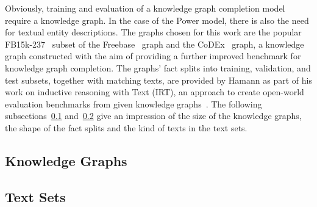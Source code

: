 Obviously, training and evaluation of a knowledge graph completion model require a knowledge graph. In the case of the Power model, there is also the need for textual entity descriptions. The graphs chosen for this work are the popular FB15k-237~\cite{Toutanova2015ObservedVL} subset of the  Freebase~\cite{Bollacker2008FreebaseAC} graph and the CoDEx~\cite{Safavi2020CoDExAC} graph, a knowledge graph constructed with the aim of providing a further improved benchmark for knowledge graph completion. The graphs' fact splits into training, validation, and test subsets, together with matching texts, are provided by Hamann as part of his work on inductive reasoning with Text (IRT), an approach to create open-world evaluation benchmarks from given knowledge graphs~\cite{}. The following subsections~\ref{subsec:5_experiments/1_data_sources/1_knowledge_graphs} and~\ref{subsec:5_experiments/1_data_sources/2_text_sets} give an impression of the size of the knowledge graphs, the shape of the fact splits and the kind of texts in the text sets.

\subsection{Knowledge Graphs}
\label{subsec:5_experiments/1_data_sources/1_knowledge_graphs}


\subsection{Text Sets}
\label{subsec:5_experiments/1_data_sources/2_text_sets}

